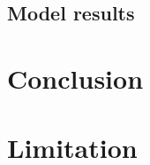 \documentclass[10pt,twoside]{article}
\numberwithin{equation}{section}
\newcommand{\?}{\stackrel{?}{=}}
\begin{document}
\subsection*{Model results}


\section*{Conclusion}

\section*{Limitation}

\printbibliography
\end{document}
